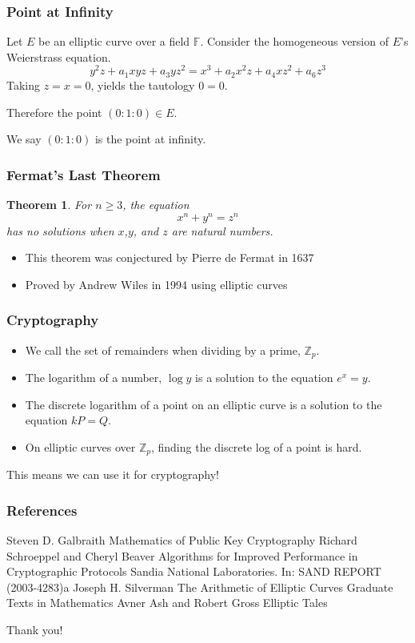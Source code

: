 \documentclass[xcolor=pdftex,dvipsnames,table]{beamer}
\theoremstyle{plain}
\newtheorem{thm}{Theorem}
\theoremstyle{definition}
\def\ZZ{\mathbb{Z}}
\def\FF{\mathbb{F}}
\begin{document}
\begin{frame}
	\frametitle{Point at Infinity}
	
	Let $E$ be an elliptic curve over a field $\FF$.
	Consider the homogeneous version of $E$'s Weierstrass equation.
	\begin{equation}\label{PWEQN}
	y^2z+a_1xyz+a_3yz^2=x^3+a_2x^2z+a_4xz^2+a_6z^3
	\end{equation}
	Taking $z=x=0$, yields the tautology $0=0$.
	
	Therefore the point $(0:1:0)\in E$.
	
	We say $(0:1:0)$ is the point at infinity.
\end{frame}

\begin{frame}
	\frametitle{Fermat's Last Theorem}
	
	\begin{thm}
	For $n\geq 3$, the equation
	\[
		x^n+y^n = z^n
	\]
	has no solutions when $x$,$y$, and $z$ are natural numbers.
	\end{thm}
	
	\begin{itemize}
	\item This theorem was conjectured by Pierre de Fermat in 1637
	\item Proved by Andrew Wiles in 1994 using elliptic curves
	\end{itemize}
\end{frame}

\begin{frame}
	\frametitle{Cryptography}
	
	\begin{itemize}
	\item We call the set of remainders when dividing by a prime, $\ZZ_p$.
	\item The logarithm of a number, $\log y$ is a solution to the equation $e^x=y$.
	\item The discrete logarithm of a point on an elliptic curve is a solution to the equation $kP=Q$.
	\item On elliptic curves over $\ZZ_p$, finding the discrete log of a point is hard.
	\end{itemize}
	
	This means we can use it for cryptography!
\end{frame}

\begin{frame}[allowframebreaks]
\frametitle{References}
\begin{thebibliography}{10}    
		Steven D. Galbraith
		\newblock Mathematics of Public Key Cryptography
		Richard Schroeppel and Cheryl Beaver
		\newblock Algorithms for Improved Performance in Cryptographic Protocols
		\newblock Sandia National Laboratories. In: SAND REPORT (2003-4283)a
		Joseph H. Silverman
		\newblock The Arithmetic of Elliptic Curves
		\newblock Graduate Texts in Mathematics
		Avner {Ash} and Robert {Gross}
		\newblock Elliptic Tales
\end{thebibliography}
\end{frame}

\begin{frame}
\begin{Large}
\begin{center}
Thank you!
\end{center}
\end{Large}
\end{frame}
\end{document}

